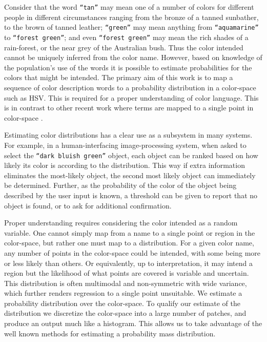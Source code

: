 \documentclass[11pt,a4paper]{article}
\newcommand{\parencite}{\citep}
\begin{document}
Consider that the word \texttt{``tan''} may mean one of a number of colors for different people in different circumstances ranging from the bronze of a tanned sunbather, to the brown of tanned leather;
\texttt{``green''} may mean anything from \texttt{``aquamarine''} to \texttt{``forest green''};
 and even \texttt{``forest green''} may mean the rich shades of a rain-forest, or the near grey of the Australian bush.
Thus the color intended cannot be uniquely inferred from the color name.
However, based on knowledge of the population's use of the words it is possible to estimate probabilities for the colors that might be intended.
The primary aim of this work is to map a sequence of color description words to a probability distribution in a color-space such as HSV.
This is required for a proper understanding of color language.
This is in contrast to other recent work where terms are mapped to a single point in color-space \parencite{DBLP:journals/corr/KawakamiDRS16}.


Estimating color distributions has a clear use as a subsystem in many systems.
For example, in a human-interfacing image-processing system, when asked to select the \texttt{``dark bluish green''} object, each object can be ranked based on how likely its color is according to the distribution.
This way if extra information eliminates the most-likely object, the second most likely object can immediately be determined.
Further, as the probability of the color of the object being described by the user input is known, a threshold can be given to report that no object is found, or to ask for additional confirmation.


Proper understanding requires considering the color intended as a random variable.
One cannot simply map from a name to a single point or region in the color-space, but rather one must map to a distribution.
For a given color name, any number of points in the color-space could be intended, with some being more or less likely than others.
Or equivalently, up to interpretation, it may intend a region but the likelihood of what points are covered is variable and uncertain.
This distribution is often multimodal and non-symmetric with wide variance, which further renders regression to a single point unsuitable.
We estimate a probability distribution over the color-space.
To qualify our estimate of the distribution we discretize the color-space into a large number of patches, and produce an output much like a histogram.
This allows us to take advantage of the well known methods for estimating a probability mass distribution.
\end{document}
